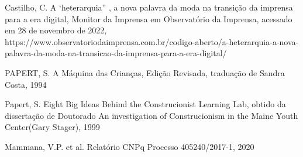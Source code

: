 \documentclass[
12pt,		%
openright,	%
twoside,  %
a4paper,			%
chapter=TITLE,		%
english,			%
french,				%
spanish,			%
brazil				%
]{USPSC-classe/USPSC}
\begin{document}
\begin{flushleft}
\begin{flushleft}
\begin{flushleft}
\begin{flushleft}
[CASTILHO, 2008] Castilho, C. A ‘heterarquia” , a nova palavra da moda na transi\c{c}\~ao da imprensa para a era digital, Monitor da Imprensa em Observat\'orio da Imprensa, acessado em 28 de novembro de 2022, https://www.observatoriodaimprensa.com.br/codigo-aberto/a-heterarquia-a-nova-palavra-da-moda-na-transicao-da-imprensa-para-a-era-digital/
\end{flushleft}


\end{flushleft}


\end{flushleft}


\end{flushleft}


\begin{flushleft}
\begin{flushleft}
\begin{flushleft}
\begin{flushleft}
[PAPERT, 1994] PAPERT, S. A M\'aquina das Crian\c{c}as, Edi\c{c}\~ao Revisada, tradua\c{c}\~ao de Sandra Costa, 1994
\end{flushleft}


\end{flushleft}


\end{flushleft}


\end{flushleft}


\begin{flushleft}
\begin{flushleft}
\begin{flushleft}
\begin{flushleft}
[PAPERT, 1999] Papert, S. Eight Big Ideas Behind the Construcionist Learning Lab, obtido da disserta\c{c}\~ao de Doutorado \textquotedbl An investigation of Construcionism in the Maine Youth Center\textquotedbl  (Gary Stager), 1999
\end{flushleft}


\end{flushleft}


\end{flushleft}


\end{flushleft}


\begin{flushleft}
\begin{flushleft}
\begin{flushleft}
\begin{flushleft}
[MAMMANA et al., 2020] Mammana, V.P. et al. Relat\'orio CNPq Processo 405240/2017-1, 2020
\end{flushleft}


\end{flushleft}


\end{flushleft}


\end{flushleft}
\end{document}
